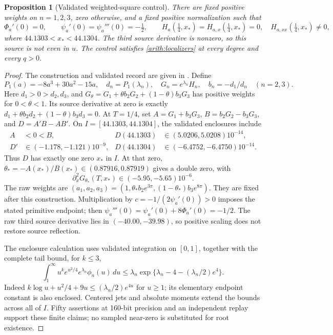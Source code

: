 \documentclass[11pt]{article}
\numberwithin{equation}{section}
\newtheorem{proposition}[theorem]{Proposition}
\theoremstyle{definition}
\theoremstyle{remark}
\begin{document}
\begin{proposition}[Validated weighted-square control]
\label{arith:weighted-control}
There are fixed positive weights on $n=1,2,3$, zero otherwise, and a fixed
positive normalization such that
\[
 \Phi_a'(0)=0,\qquad \psi_a'(0)=\psi_a'''(0)=-\tfrac12,
 \qquad H_a(\tfrac14,x_*)=H_{a,x}(\tfrac14,x_*)=0,
 \quad H_{a,xx}(\tfrac14,x_*)\ne0,
\]
where $44.1303<x_*<44.1304$.  The third source derivative is nonzero, so
this source is not even in $u$.  The control satisfies
\eqref{arith:localizers} at every degree and every $q>0$.
\end{proposition}
\begin{proof}
The construction and validated record are given in
\cite{ThetaSquareControl}.  Define
\[
 P_1(a)=-8a^3+30a^2-15a,\quad d_n=P_1(\lambda_n),\quad
 G_n=e^{\lambda_n}H_n,\quad b_n=-d_1/d_n\quad(n=2,3).
\]
Here $d_1>0>d_2,d_3$, and
$G_\theta=G_1+\theta b_2G_2+(1-\theta)b_3G_3$ has positive weights
for $0<\theta<1$.  Its source derivative at zero is exactly
$d_1+\theta b_2d_2+(1-\theta)b_3d_3=0$.
At $T=1/4$, set $A=G_1+b_3G_3$, $B=b_2G_2-b_3G_3$, and
$D=A'B-AB'$.  On $I=[44.1303,44.1304]$, the validated enclosures include
\begin{align*}
 A&<0<B,&
 D(44.1303)&\in(5.0206,5.0208)10^{-14},\\
 D'&\in(-1.178,-1.121)10^{-9},&
 D(44.1304)&\in(-6.4752,-6.4750)10^{-14}.
\end{align*}
Thus $D$ has exactly one zero $x_*$ in $I$.  At that zero,
$\theta_*=-A(x_*)/B(x_*)\in(0.87916,0.87919)$ gives a double zero, with
\[
 \partial_x^2G_{\theta_*}(T,x_*)\in(-5.95,-5.65)10^{-6}.
\]
The raw weights are
$(a_1,a_2,a_3)=(1,\theta_*b_2e^{3\pi},(1-\theta_*)b_3e^{8\pi})$.
They are fixed after this construction.  Multiplication by
$c=-1/(2\psi_a'(0))>0$ imposes the stated primitive endpoint; then
$\psi_a'''(0)=\psi_a'(0)+8\Phi_a'(0)=-1/2$.
The raw third source derivative lies in $(-40.00,-39.98)$, so positive
scaling does not restore source reflection.

The enclosure calculation uses validated integration on $[0,1]$, together
with the complete tail bound, for $k\le3$,
\[
 \int_1^\infty u^ke^{u^2/4}e^{\lambda_n}\phi_n(u)\,du
 \le\lambda_n\exp\{\lambda_n-4-(\lambda_n/2)e^4\}.
\]
Indeed $k\log u+u^2/4+9u\le(\lambda_n/2)e^{4u}$ for $u\ge1$;
its elementary endpoint constant is also enclosed.  Centered jets and
absolute moments extend the bounds across all of $I$.  Fifty assertions
at 160-bit precision and an independent replay support these finite
claims; no sampled near-zero is substituted for root existence.
\end{proof}
\end{document}
